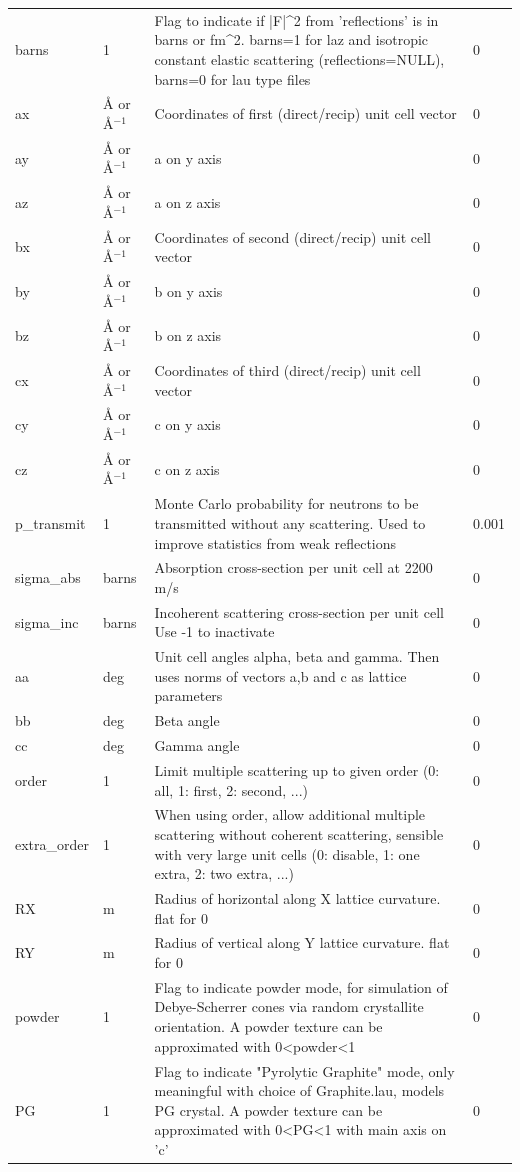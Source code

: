 \begin{longtable}{p{}p{}p{}p{}}
barns & 1 & Flag to indicate if |F|\textasciicircum{}2 from 'reflections' is in barns or fm\textasciicircum{}2. barns=1 for laz and isotropic constant elastic scattering (reflections=NULL), barns=0 for lau type files & 0 \\
ax & \AA{} or \AA{}$^{-1}$ & Coordinates of first (direct/recip) unit cell vector & 0 \\
ay & \AA{} or \AA{}$^{-1}$ & a on y axis & 0 \\
az & \AA{} or \AA{}$^{-1}$ & a on z axis & 0 \\
bx & \AA{} or \AA{}$^{-1}$ & Coordinates of second (direct/recip) unit cell vector & 0 \\
by & \AA{} or \AA{}$^{-1}$ & b on y axis & 0 \\
bz & \AA{} or \AA{}$^{-1}$ & b on z axis & 0 \\
cx & \AA{} or \AA{}$^{-1}$ & Coordinates of third (direct/recip) unit cell vector & 0 \\
cy & \AA{} or \AA{}$^{-1}$ & c on y axis & 0 \\
cz & \AA{} or \AA{}$^{-1}$ & c on z axis & 0 \\
p\_transmit & 1 & Monte Carlo probability for neutrons to be transmitted without any scattering. Used to improve statistics from weak reflections & 0.001 \\
sigma\_abs & barns & Absorption cross-section per unit cell at 2200 m/s & 0 \\
sigma\_inc & barns & Incoherent scattering cross-section per unit cell Use -1 to inactivate & 0 \\
aa & deg & Unit cell angles alpha, beta and gamma. Then uses norms of vectors a,b and c as lattice parameters & 0 \\
bb & deg & Beta angle & 0 \\
cc & deg & Gamma angle & 0 \\
order & 1 & Limit multiple scattering up to given order (0: all, 1: first, 2: second, ...) & 0 \\
extra\_order & 1 & When using order, allow additional multiple scattering without coherent scattering, sensible with very large unit cells (0: disable, 1: one extra, 2: two extra, ...) & 0 \\
RX & m & Radius of horizontal along X lattice curvature. flat for 0 & 0 \\
RY & m & Radius of vertical along Y lattice curvature. flat for 0 & 0 \\
powder & 1 & Flag to indicate powder mode, for simulation of Debye-Scherrer cones via random crystallite orientation. A powder texture can be approximated with 0\textless{}powder\textless{}1 & 0 \\
PG & 1 & Flag to indicate "Pyrolytic Graphite" mode, only meaningful with choice of Graphite.lau, models PG crystal. A powder texture can be approximated with 0\textless{}PG\textless{}1 with main axis on 'c' & 0 \\
\bottomrule
\end{longtable}

